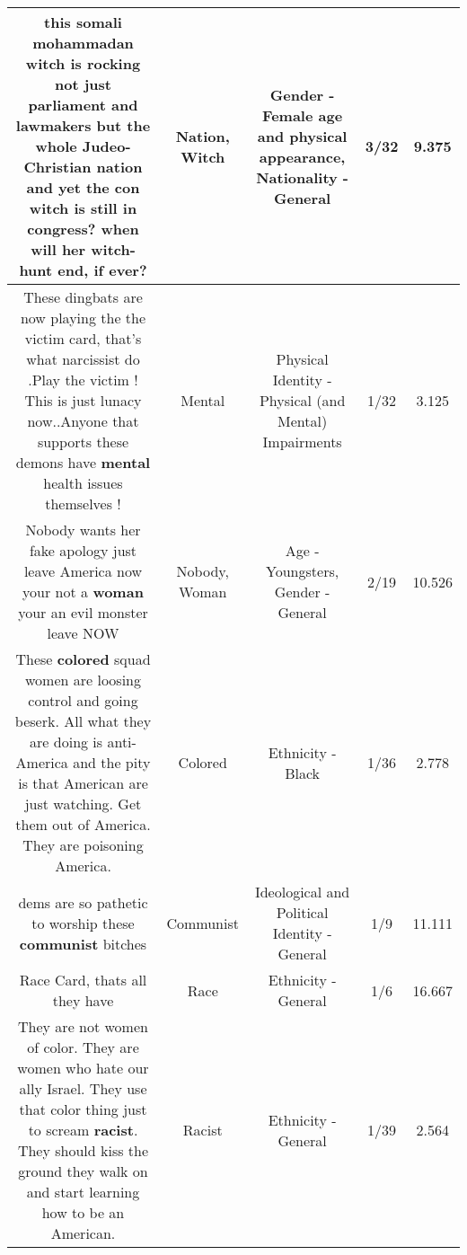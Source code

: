\documentclass[11pt]{article}
\newlength\mylength
\begin{document}
\begin{center}
\begin{longtable}{|C{.65\mylength}|C{.30\mylength}|C{.12\mylength}|C{.12\mylength}|C{.12\mylength}|}
  \small this somali mohammadan \textbf{witch} is rocking not just parliament and lawmakers but the whole Judeo-Christian \textbf{nation} and yet the con \textbf{witch} is still in congress?  when will her \textbf{witch}-hunt end, if ever?\normalsize   & Nation, Witch & Gender - Female age and physical appearance, Nationality - General & 3/32 & 9.375 \\  \hline
  \small These  dingbats are now playing the the victim card, that's what narcissist do .Play the victim !  This is just lunacy now..Anyone that supports these demons have \textbf{mental} health issues themselves !\normalsize   & Mental & Physical Identity - Physical (and Mental) Impairments & 1/32 & 3.125 \\  \hline
  \small Nobody wants her fake apology just leave America now your not a \textbf{woman} your an evil monster leave NOW\normalsize   & Nobody, Woman & Age - Youngsters, Gender - General & 2/19 & 10.526 \\  \hline
  \small These \textbf{colored} squad women are loosing control and going beserk. All what they are doing is anti- America and the pity is that American are just watching. Get them out of America. They are poisoning America.\normalsize   & Colored & Ethnicity - Black & 1/36 & 2.778 \\  \hline
  \small dems are so pathetic to worship these \textbf{communist} bitches\normalsize   & Communist &  Ideological and Political Identity - General & 1/9 & 11.111 \\  \hline
  \small Race Card, thats all they have\normalsize   & Race & Ethnicity - General & 1/6 & 16.667 \\  \hline
  \small They are not women of color. They are women who hate our ally Israel. They use that color thing just to scream \textbf{racist}. They should kiss the ground they walk on  and start learning how to be an American.\normalsize   & Racist & Ethnicity - General & 1/39 & 2.564 \\  \hline

\end{longtable}
\end{center}
\end{document}
